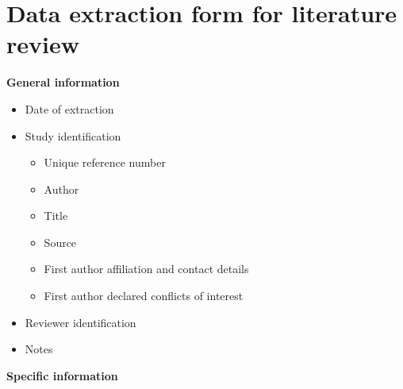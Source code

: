 
\chapter{Data extraction form for literature review}
\label{appendixb}

\textbf{General information}

\begin{itemize}
\item Date of extraction

\item Study identification

\begin{itemize}
\item Unique reference number

\item Author

\item Title

\item Source

\item First author affiliation and contact details

\item First author declared conflicts of interest

\end{itemize}

\item Reviewer identification

\item Notes

\end{itemize}

\textbf{Specific information}


